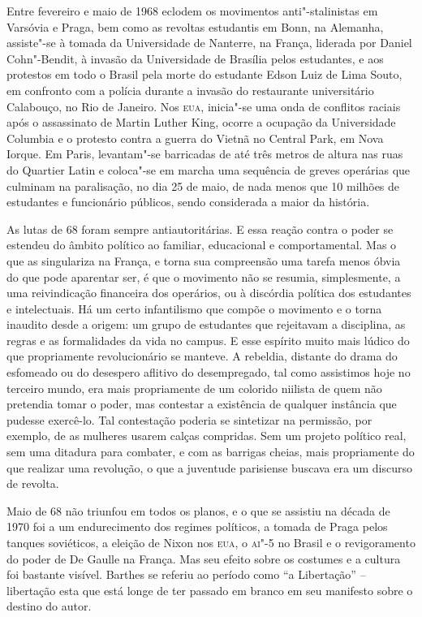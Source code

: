 Entre fevereiro e maio de 1968 eclodem os movimentos anti"-stalinistas em
Varsóvia e Praga, bem como as revoltas estudantis em Bonn, na Alemanha,
assiste"-se à tomada da Universidade de Nanterre, na França, liderada por
Daniel Cohn"-Bendit, à invasão da Universidade de Brasília pelos
estudantes, e aos protestos em todo o Brasil pela morte do estudante
Edson Luiz de Lima Souto, em confronto com a polícia durante a invasão
do restaurante universitário Calabouço, no Rio de Janeiro. Nos
\textsc{eua}, inicia"-se uma onda de conflitos raciais após o assassinato
de Martin Luther King, ocorre a ocupação da Universidade Columbia e o
protesto contra a guerra do Vietnã no Central Park, em Nova Iorque. Em
Paris, levantam"-se barricadas de até três metros de altura nas ruas do
Quartier Latin e coloca"-se em marcha uma sequência de greves operárias
que culminam na paralisação, no dia 25 de maio, de nada menos que 10
milhões de estudantes e funcionário públicos, sendo considerada a maior
da história.

As lutas de 68 foram sempre antiautoritárias. E essa reação contra o
poder se estendeu do âmbito político ao familiar, educacional e
comportamental. Mas o que as singulariza na França, e torna sua
compreensão uma tarefa menos óbvia do que pode aparentar ser, é que o
movimento não se resumia, simplesmente, a uma reivindicação financeira
dos operários, ou à discórdia política dos estudantes e intelectuais. Há
um certo infantilismo que compõe o movimento e o torna inaudito desde a
origem: um grupo de estudantes que rejeitavam a disciplina, as regras e
as formalidades da vida no campus. E esse espírito muito mais lúdico do
que propriamente revolucionário se manteve. A rebeldia, distante do
drama do esfomeado ou do desespero aflitivo do desempregado, tal como
assistimos hoje no terceiro mundo, era mais propriamente de um colorido
niilista de quem não pretendia tomar o poder, mas contestar a existência
de qualquer instância que pudesse exercê-lo. Tal contestação poderia se
sintetizar na permissão, por exemplo, de as mulheres usarem calças
compridas. Sem um projeto político real, sem uma ditadura para combater,
e com as barrigas cheias, mais propriamente do que realizar uma
revolução, o que a juventude parisiense buscava era um discurso de
revolta.

Maio de 68 não triunfou em todos os planos, e o que se assistiu na
década de 1970 foi a um endurecimento dos regimes políticos, a tomada de
Praga pelos tanques soviéticos, a eleição de Nixon nos \textsc{eua}, o
\textsc{ai"-5} no Brasil e o revigoramento do poder de De Gaulle na
França. Mas seu efeito sobre os costumes e a cultura foi bastante
visível. Barthes se referiu ao período como ``a Libertação'' --
libertação esta que está longe de ter passado em branco em seu manifesto
sobre o destino do autor.

